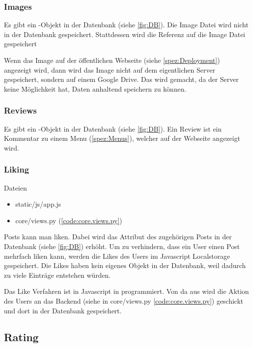 \subsubsection{Images} \label{spez:Images}

Es gibt ein -Objekt in der Datenbank (siehe \ref{fig:DB}). Die Image
Datei wird nicht in der Datenbank gespeichert. Stattdessen wird die Referenz auf
die Image Datei gespeichert

Wenn das Image auf der öffentlichen Webseite (siehe \ref{spez:Deployment})
angezeigt wird, dann wird das Image nicht auf dem eigentlichen Server
gespeichert, sondern auf einem Google Drive. Das wird gemacht, da der Server
keine Möglichkeit hat, Daten anhaltend speichern zu können.

\subsubsection{Reviews} \label{spez:Reviews}

Es gibt ein -Objekt in der Datenbank (siehe \ref{fig:DB}). Ein
Review ist ein Kommentar zu einem Menu (\ref{spez:Menus}), welcher auf der
Webseite angezeigt wird.

\subsubsection{Liking} \label{spez:Liking} Dateien
\begin{itemize}
    \item static/js/app.js
    \item core/views.py (\ref{code:core.views.py})
\end{itemize}

Posts kann man liken. Dabei wird das  Attribut des zugehörigen Posts
in der Datenbank (siehe \ref{fig:DB}) erhöht. Um zu verhindern, dass ein User
einen Post mehrfach liken kann, werden die Likes des Users im Javascript
Localstorage gespeichert. Die Likes haben kein eigenes Objekt in der Datenbank,
weil dadurch zu viele Einträge entstehen würden.

Das Like Verfahren ist in Javascript in  programmiert.
Von da aus wird die Aktion des Users an das Backend (siehe  in
core/views.py \ref{code:core.views.py}) geschickt und dort in der Datenbank
gespeichert.

\subsection{Rating} \label{spez:Rating}


